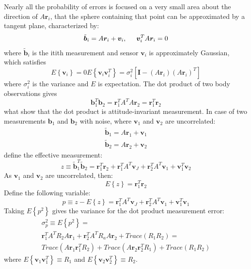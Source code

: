 \documentclass[12pt,a4paper,oneside]{article}
\begin{document}
Nearly all the probability of errors is focused on a very small area about the direction of $A\bm{r}_i$, that the sphere containing that point can be approximated by a tangent plane, characterized by:
\begin{equation}
\tilde{\bm{b}}_i = A\bm{r}_i + \bm{v}_i, \hspace{0.5cm} \bm{v}_i^TA\bm{r}_i = 0
\end{equation}
where $\tilde{\bm{b}}_i$ is the it{i}th measurement and sensor $\bm{v}_i$ is approximately Gaussian, which satisfies
\begin{subequations}
\begin{equation}
E\left\{\bm{v}_i\right\} = 0
\end{equation}
\begin{equation}
E\left\{\bm{v}_i\bm{v}_i^T\right\} = \sigma_i^2 [\bm{I} - (A\bm{r}_i)(A\bm{r}_i)^T]
\end{equation}
\end{subequations}
where $\sigma_i^2$ is the variance and $E$ is expectation.
The dot product of two body observations gives
\begin{equation}
\bm{b}_1^T\bm{b}_2 = \bm{r}_1^TA^TA\bm{r}_2 = \bm{r}_1^T\bm{r}_2
\end{equation}
what show that the dot product is attitude-invariant measurement.
In case of two measurements $\bm{b}_1$ and $\bm{b}_2$ with noise, where $\bm{v}_1$ and $\bm{v}_2$ are uncorrelated:
\begin{subequations}
\begin{align*}
\tilde{\bm{b}}_1 = A\bm{r}_1 + \bm{v}_1\\
\tilde{\bm{b}}_2 = A\bm{r}_2 + \bm{v}_2
\end{align*}
\end{subequations}
define the effective measurement:
\begin{equation}
z \equiv \tilde{\bm{b}}_1^T\tilde{\bm{b}}_2 = \bm{r}_1^T\bm{r}_2 + \bm{r}_1^TA^T\bm{v}_J + \bm{r}_2^TA^T\bm{v}_1 + \bm{v}_1^T\bm{v}_2
\end{equation}
As $\bm{v}_1$ and $\bm{v}_2$ are uncorrelated, then:
\begin{equation}
E\left\{z\right\} = \bm{r}_1^T\bm{r}_2
\end{equation}
Define the following variable:
\begin{equation}
p \equiv z - E\left\{z\right\} = \bm{r}_1^TA^T\bm{v}_J + \bm{r}_2^TA^T\bm{v}_1 + \bm{v}_1^T\bm{v}_1
\end{equation}
Taking $E\left\{p^2\right\}$ gives the variance for the dot product measurement error:
\begin{equation}
\begin{split}
\sigma_p^2 \equiv E\left\{p^2\right\} = \\
\bm{r}_1^TA^TR_2A\bm{r}_1 + \bm{r}_2^TA^TR_aA\bm{r}_2 + Trace(R_1R_2) = \\
Trace(A\bm{r}_1\bm{r}_1^TR_2) + Trace(A\bm{r}_2\bm{r}_2^TR_1) + Trace(R_1R_2)
\end{split}
\end{equation}
where $E\left\{\bm{v}_1\bm{v}_1^T\right\}\equiv R_1$ and $E\left\{\bm{v}_2\bm{v}_2^T\right\}\equiv R_2$.
\end{document}
